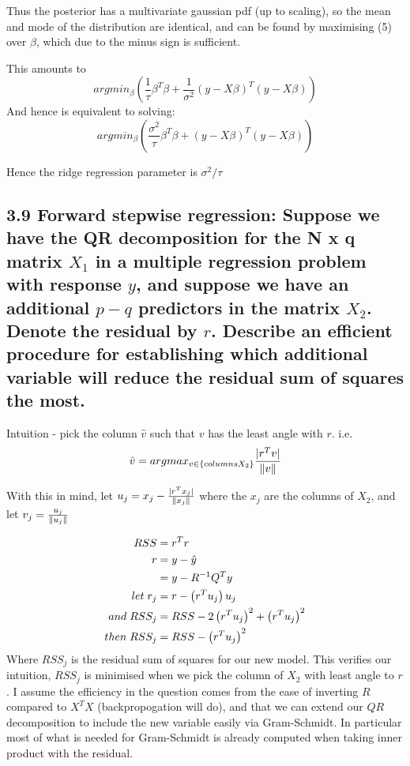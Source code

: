 Thus the posterior has a multivariate gaussian pdf (up to scaling), so the mean and mode of the distribution are identical, and can be found by maximising (5) over $\beta$, which due to the minus sign is sufficient.

This amounts to
$$argmin_\beta \left( \frac{1}{\tau}\beta^T \beta  +  \frac{1}{\sigma^2}\left(y - X\beta\right) ^T \left(y - X\beta\right)\right)$$ 
And hence is equivalent to solving:
$$argmin_\beta  \left(\frac{\sigma^2}{\tau}\beta^T \beta  + \left(y - X\beta\right) ^T \left(y - X\beta\right)\right)$$

Hence the ridge regression parameter is $\sigma^2 / \tau$

\subsection*{3.9 Forward stepwise regression: Suppose we have the QR decomposition for the N x q matrix $X_1$ in a multiple regression problem with response $y$, and suppose we have an additional $p-q$ predictors in the matrix $X_2$. Denote the residual by $r$. Describe an efficient procedure for establishing which additional variable will reduce the residual sum of squares the most.}

Intuition - pick the column $\hat{v}$ such that $v$ has the least angle with $r$.
i.e. $$\hat{v} = argmax_{v \in \{columns X_2\}} \frac{\lvert r^T v\rvert}{\left\lVert v\right\rVert}$$

With this in mind, let $u_j = x_j - \frac{\lvert r^T x_j\rvert}{\left\lVert x_j\right\rVert}$ where the $x_j$ are the columns of $X_2$, and let $v_j = \frac{u_j}{\left\lVert u_j\right\rVert}$

\begin{align*}
    RSS &= r^T r \\
    r &= y - \hat{y} \\
    &= y - R^{-1} Q^T y\\
    let\hspace{1mm} r_j &= r -  \left(r^T u_j\right) u_j \\
    and\hspace{1mm} RSS_j &= RSS - 2 \left(r^T u_j\right)^2  + \left(r^T u_j\right)^2\\
    then\hspace{1mm} RSS_j &= RSS -  \left(r^T u_j\right)^2\\
\end{align*}
Where $RSS_j$ is the residual sum of squares for our new model.
This verifies our intuition, $RSS_j$ is minimised when we pick the column of $X_2$ with least angle to $r$.
I assume the efficiency in the question comes from the ease of inverting $R$ compared to $X^T X$ (backpropogation will do), and that we can extend our $QR$ decomposition to include the new variable easily via Gram-Schmidt. In particular most of what is needed for Gram-Schmidt is already computed when taking inner product with the residual.

